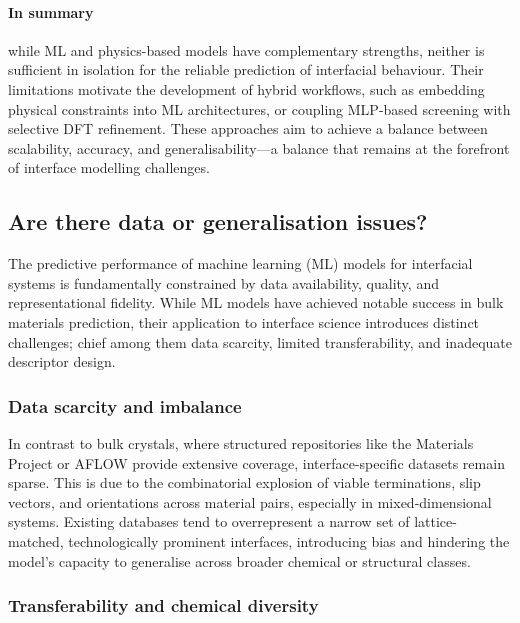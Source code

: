 \paragraph{In summary} while ML and physics-based models have complementary strengths, neither is sufficient in isolation for the reliable prediction of interfacial behaviour. Their limitations motivate the development of hybrid workflows, such as embedding physical constraints into ML architectures, or coupling MLP-based screening with selective DFT refinement. These approaches aim to achieve a balance between scalability, accuracy, and generalisability---a balance that remains at the forefront of interface modelling challenges. 
 
\subsection{Are there data or generalisation issues?} 
 
The predictive performance of machine learning (ML) models for interfacial systems is fundamentally constrained by data availability, quality, and representational fidelity. While ML models have achieved notable success in bulk materials prediction, their application to interface science introduces distinct challenges; chief among them data scarcity, limited transferability, and inadequate descriptor design. 
 
\subsubsection{Data scarcity and imbalance} 
 
In contrast to bulk crystals, where structured repositories like the Materials Project or AFLOW provide extensive coverage, interface-specific datasets remain sparse. This is due to the combinatorial explosion of viable terminations, slip vectors, and orientations across material pairs, especially in mixed-dimensional systems. Existing databases tend to overrepresent a narrow set of lattice-matched, technologically prominent interfaces, introducing bias and hindering the model's capacity to generalise across broader chemical or structural classes. 
 
 
\subsubsection{Transferability and chemical diversity} 
 
